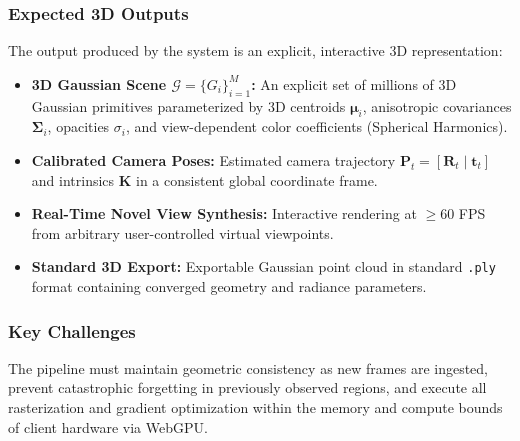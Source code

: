\documentclass[conference]{IEEEtran}
\begin{document}
\subsubsection{Expected 3D Outputs}
The output produced by the system is an explicit, interactive 3D representation:
\begin{itemize}
    \item \textbf{3D Gaussian Scene $\mathcal{G} = \{G_i\}_{i=1}^M$:} An explicit set of millions of 3D Gaussian primitives parameterized by 3D centroids $\boldsymbol{\mu}_i$, anisotropic covariances $\boldsymbol{\Sigma}_i$, opacities $\sigma_i$, and view-dependent color coefficients (Spherical Harmonics).
    \item \textbf{Calibrated Camera Poses:} Estimated camera trajectory $\mathbf{P}_t = [\mathbf{R}_t \mid \mathbf{t}_t]$ and intrinsics $\mathbf{K}$ in a consistent global coordinate frame.
    \item \textbf{Real-Time Novel View Synthesis:} Interactive rendering at $\ge 60$ FPS from arbitrary user-controlled virtual viewpoints.
    \item \textbf{Standard 3D Export:} Exportable Gaussian point cloud in standard \texttt{.ply} format containing converged geometry and radiance parameters.
\end{itemize}

\subsubsection{Key Challenges}
The pipeline must maintain geometric consistency as new frames are ingested, prevent catastrophic forgetting in previously observed regions, and execute all rasterization and gradient optimization within the memory and compute bounds of client hardware via WebGPU.
\end{document}
